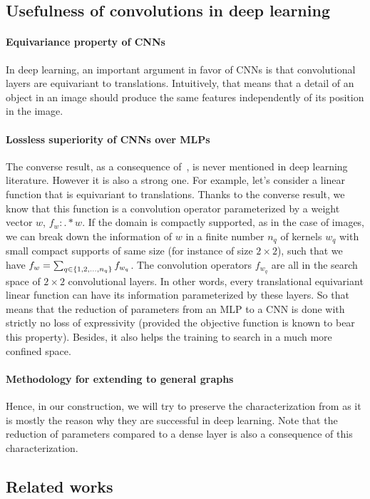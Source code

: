 \subsection{Usefulness of convolutions in deep learning}
\label{sec:cnnvsmlp}

\paragraph{Equivariance property of CNNs}
In deep learning, an important argument in favor of CNNs is that convolutional layers are equivariant to translations. Intuitively, that means that a detail of an object in an image should produce the same features independently of its position in the image.

\paragraph{Lossless superiority of CNNs over MLPs}
The converse result, as a consequence of~, is never mentioned in deep learning literature. However it is also a strong one. For example, let's consider a linear function that is equivariant to translations. Thanks to the converse result, we know that this function is a convolution operator parameterized by a weight vector $w$, $f_w : . \ast w$. If the domain is compactly supported, as in the case of images, we can break down the information of $w$ in a finite number $n_q$ of kernels $w_q$  with small compact supports of same size (for instance of size $2 \times 2$), such that we have $f_w = \sum_{q \in \{1, 2, \ldots, n_q\}} f_{w_q}$. The convolution operators $f_{w_q}$ are all in the search space of $2 \times 2$ convolutional layers. In other words, every translational equivariant linear function can have its information parameterized by these layers. So that means that the reduction of parameters from an MLP to a CNN is done with strictly no loss of expressivity (provided the objective function is known to bear this property). Besides, it also helps the training to search in a much more confined space.

\paragraph{Methodology for extending to general graphs}
Hence, in our construction, we will try to preserve the characterization from  as it is mostly the reason why they are successful in deep learning. Note that the reduction of parameters compared to a dense layer is also a consequence of this characterization.

\subsection{Related works}

\todo{}





